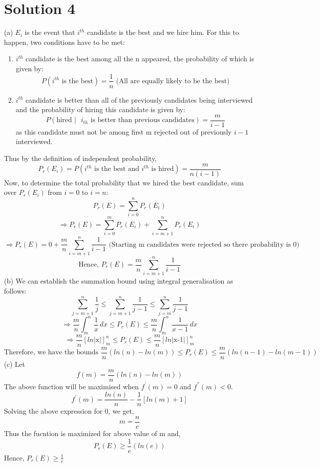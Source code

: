 \documentclass[fleqn]{article}
\begin{document}
\section{Solution 4}
(a) $E_i$ is the event that $i^{th}$ candidate is the best and we hire him. For this to happen, two conditions have to be met:
\begin{enumerate}
    \item $i^{th}$ candidate is the best among all the n appeared, the probability of which is given by:
    \[ P(\text{$i^{th}$ is the best})=\frac{1}{n} \text{     (All are equally likely to be the best)} \]
    \item  $i^{th}$ candidate is better than all of the previously candidates being interviewed and the probability of hiring this candidate is given by:
    \[
    P(\text{hired $\vert$ $i_{th}$ is better than previous candidates})=\frac{m}{i-1}
    \]
    as this candidate must not be among first m rejected out of previously $i-1$ interviewed.
\end{enumerate}
Thus by the definition of independent probability, 
\begin{equation}
    P_{r}(E_{i})=P(\text{$i^{th}$ is the best and $i^{th}$ is hired})=\frac{m}{n(i-1)}
\end{equation}
Now, to determine the total probability that we hired the best candidate, sum over $P_{r}(E_{i})$ from $i=0$ to $i=n$:
\[
P_{r}(E)=\sum_{i=0}^{n}{P_{r}(E_{i})}
\]
\[
\Rightarrow P_{r}(E)=\sum_{i=0}^{m}{P_{r}(E_{i})} +\sum_{i=m+1}^{n}{P_{r}(E_{i})}
\]
\[
\Rightarrow P_{r}(E)=0 + \frac{m}{n} \sum_{i=m+1}^{n} {\frac{1}{i-1}} \text{ (Starting m candidates were rejected so there probability is 0)}
\]
\[
\text{Hence, } P_{r}(E)= \frac{m}{n} \sum_{i=m+1}^{n} {\frac{1}{i-1}}
\]
(b) We can establish the summation bound using integral generalisation as follows:
\[
\sum_{j=m+1}^{n}{\frac{1}{j}} \leq \sum_{j=m+1}^{n} {\frac{1}{j-1}} \leq \sum_{j=m}^{n}{\frac{1}{j-1}}
\]
\newline
\[
\Rightarrow \frac{m}{n}\int_{m}^{n} \frac{1}{x} \,dx  \leq P_{r}(E) \leq \frac{m}{n}\int_{m}^{n} \frac{1}{x-1} \,dx
\]
\newline
\[
\Rightarrow \frac{m}{n}[ln\vert \text{x}\vert]_{m}^{n} \leq P_{r}(E) \leq \frac{m}{n}[ln\vert \text{x-1}\vert]_{m}^{n}
\]
\newline
\[
\text{Therefore, we have the bounds } \frac{m}{n}(ln(n)-ln(m)) \leq P_{r}(E) \leq \frac{m}{n} (ln(n-1)-ln(m-1))
\]
(c) Let \[ f(m)= \frac{m}{n}(ln(n)-ln(m))\]
The above function will be maximised when $f^{'}(m)=0$ and $f^{''}(m)<0$.
\[
f^{'}(m)= \frac{ln(n)}{n}-\frac{1}{n}[ln(m) + 1]
\]
Solving the above expression for 0, we get,
\[
m=\frac{n}{e}
\]
Thus the fucntion is maximized for above value of m and,
\[
P_{r}(E) \geq \frac{1}{e}(ln(e))
\] 
Hence, $P_{r}(E) \geq \frac{1}{e}$
\newpage
\end{document}
